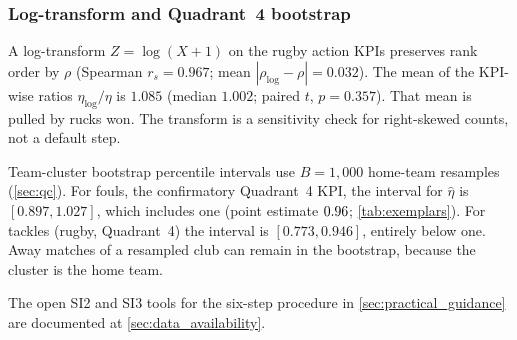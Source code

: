 \subsubsection*{Log-transform and Quadrant~4 bootstrap}
\label{sec:si_landscape_qc}
\label{sec:si_note_s1}

A log-transform $Z=\log(X+1)$ on the \PEFrugbyNkpis{} rugby action KPIs preserves rank order by $\rho$ (Spearman $r_{s}=0.967$; mean $|\rho_{\log}-\rho|=0.032$). The mean of the KPI-wise ratios $\eta_{\log}/\eta$ is $1.085$ (median $1.002$; paired $t$, $p=0.357$). That mean is pulled by rucks won. The transform is a sensitivity check for right-skewed counts, not a default step.

Team-cluster bootstrap percentile intervals use $B=1{,}000$ home-team resamples (\cref{sec:qc}). For fouls, the confirmatory Quadrant~4 KPI, the interval for $\hat\eta$ is $[0.897, 1.027]$, which includes one (point estimate $0.96$; \cref{tab:exemplars}). For tackles (rugby, Quadrant~4) the interval is $[0.773, 0.946]$, entirely below one. Away matches of a resampled club can remain in the bootstrap, because the cluster is the home team.

\label{sec:si_practitioner}
\label{sec:si_note_s4}
The open SI2 and SI3 tools for the six-step procedure in \cref{sec:practical_guidance} are documented at \cref{sec:data_availability}.
